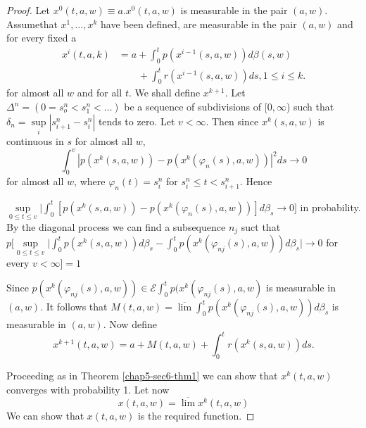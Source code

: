 \begin{proof}
Let $x^0 (t, a, w) \equiv a. x^0 (t,a,w)$ is measurable in the pair $(a, w)$. 
Assume\pageoriginale that $x^1, \ldots , x^k$ have been defined, are
measurable in 
the pair $(a, w)$ and for every fixed a 
\begin{align*}
x^i (t, a, k) &= a + \int^t_0 p(x^{i - 1}(s, a, w))d \beta (s, w)\\
&\qquad +
\int^t_0 r(x^{i-1}(s, a, w))ds, 1 \leq i \leq k. 
\end{align*}
for almost all $w$ and for all $t$. We shall define $x^{k+1}$. Let
$\Delta^n = (0=s^n_o < s^n_1 < \ldots)$ be a sequence of
subdivisions of [$0, \infty$) such that $\delta_n = \sup\limits_i |
  s^n_{i+1} - s^n_i |$ tends to zero. Let $v < \infty$. Then since
  $x^k (s, a, w)$ is continuous in $s$ for almost all $w$, 
$$
\int^v_0 | p(x^k (s, a, w))- p(x^k(\varphi_n (s), a, w))|^2 ds \rightarrow 0
$$
for almost all $w$, where $\varphi_n (t) = s^n_i$ for $s^n_i \leq t <
s^n_{i+1}$. Hence  

$\sup\limits_{0 \leq t \leq v} \big| \int^t_0 [p(x^k(s, a, w)) -
  p(x^k(\varphi_n (s), a, w))]d \beta_s \rightarrow 0]$ in
probability. By the diagonal process we can find a subsequence $n_j$
suct that 
$p[\sup\limits_{0 \leq t \leq v} | \int^t_0 p(x^k(s, a, w))d \beta_s -
  \int^t_0 p(x^k(\varphi_{nj} (s), a, w)) d \beta_s \big| \rightarrow
  0$ for every $v< \infty ] = 1$ 

Since $p(x^k(\varphi_{nj} (s), a, w)) \in \mathscr{E} \int^t_0
p(x^k(\varphi_{nj} (s), a, w)$ is measurable in $(a, w)$. It follows
that $M(t, a, w) = \overline{\lim} \int^t_0 p(x^k(\varphi_{nj}(s), a,
w))d \beta_s$ is measurable in $(a, w)$. Now define 
$$
x^{k+1}(t, a, w ) =  a + M(t, a, w) + \int^t_0 r(x^k(s, a, w))ds.
$$\pageoriginale

Proceeding as in Theorem \ref{chap5-sec6-thm1} we can show that $x^k (t, a, w)$
converges with probability 1. Let now  
$$
x(t, a, w) = \overline{\lim}x^k (t, a, w)
$$
We can show that $x(t, a, w)$ is the required function.
\end{proof}

